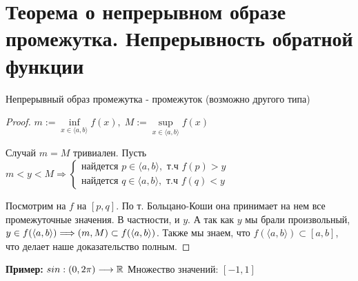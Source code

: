 \section{Теорема о непрерывном образе промежутка. Непрерывность обратной функции}
\begin{theorem-non}
    Непрерывный образ промежутка - промежуток (возможно другого типа)

    \begin{proof} \quad

        $m:= \inf\limits_{x \in \langle a, b \rangle}{f(x)}, \; M:= \sup\limits_{x \in \langle a, b \rangle}{f(x)}$

        Случай $m = M$ тривиален. Пусть $m < y < M \Longrightarrow \begin{cases}
            \text{найдется } p \in \langle a, b \rangle, \text{ т.ч } f(p) > y \\
            \text{найдется } q \in \langle a, b \rangle, \text{ т.ч } f(q) < y
        \end{cases}$

        Посмотрим на $f$ на $[p, q]$. По т. Больцано-Коши она принимает на нем все промежуточные значения.
        В частности, и $y$.
        А так как $y$ мы брали произвольный, $y \in f(\langle a, b \rangle) \Longrightarrow \\
        (m, M) \subset f(\langle a, b \rangle)$. Также мы знаем, что $f(\langle a, b \rangle) \subset [a, b]$, что делает наше доказательство полным.
    \end{proof}
    \textbf{Пример:} $sin: (0, 2\pi) \longrightarrow \mathbb{R}$ \qquad Множество значений: $[-1, 1]$ 
\end{theorem-non}
